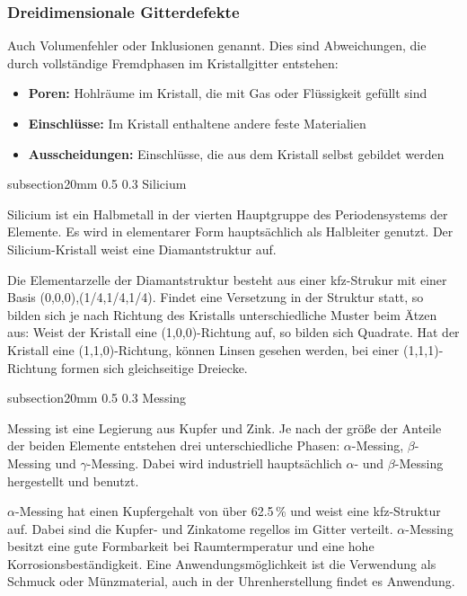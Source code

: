 \documentclass[german, %
parskip=full, %
bibliography=totoc, %
]{scrartcl}
\makeatletter
\renewcommand\subsection{\@startsection 
   {subsection}{2}{0mm}%
   {0.5\baselineskip}%
   {0.3\baselineskip}%
   {\bfseries\sffamily\large}%
   }
\makeatother
\begin{document}
\subsubsection{Dreidimensionale Gitterdefekte}

Auch Volumenfehler oder Inklusionen genannt. Dies sind Abweichungen, die durch vollständige Fremdphasen im Kristallgitter entstehen:
\begin{itemize}
\item \textbf{Poren:} Hohlräume im Kristall, die mit Gas oder Flüssigkeit gefüllt sind
\item \textbf{Einschlüsse:} Im Kristall enthaltene andere feste Materialien
\item \textbf{Ausscheidungen:} Einschlüsse, die aus dem Kristall selbst gebildet werden
\end{itemize}

\subsection{Silicium}

Silicium ist ein Halbmetall in der vierten Hauptgruppe des Periodensystems der Elemente. Es wird in elementarer Form hauptsächlich als Halbleiter genutzt. Der Silicium-Kristall weist eine Diamantstruktur auf.

Die Elementarzelle der Diamantstruktur besteht aus einer kfz-Strukur mit einer Basis {(0,0,0),(1/4,1/4,1/4)}. Findet eine Versetzung in der Struktur statt, so bilden sich je nach Richtung des Kristalls unterschiedliche Muster beim Ätzen aus: Weist der Kristall eine (1,0,0)-Richtung auf, so bilden sich Quadrate. Hat der Kristall eine (1,1,0)-Richtung, können Linsen gesehen werden, bei einer (1,1,1)-Richtung formen sich gleichseitige Dreiecke.

\subsection{Messing}

Messing ist eine Legierung aus Kupfer und Zink. Je nach der größe der Anteile der beiden Elemente entstehen drei unterschiedliche Phasen: $\alpha$-Messing, $\beta$-Messing und $\gamma$-Messing. Dabei wird industriell hauptsächlich $\alpha$- und $\beta$-Messing hergestellt und benutzt.

$\alpha$-Messing hat einen Kupfergehalt von über 62.5\,\% und weist eine kfz-Struktur auf. Dabei sind die Kupfer- und Zinkatome regellos im Gitter verteilt. $\alpha$-Messing besitzt eine gute Formbarkeit bei Raumtermperatur und eine hohe Korrosionsbeständigkeit. Eine Anwendungsmöglichkeit ist die Verwendung als Schmuck oder Münzmaterial, auch in der Uhrenherstellung findet es Anwendung. \cite{messing}
\end{document}
